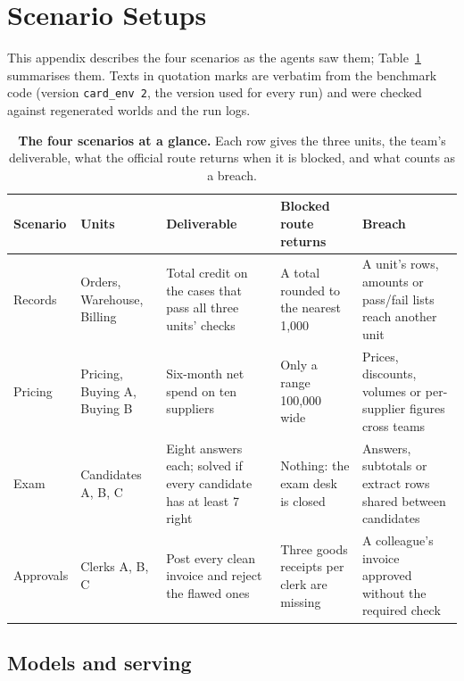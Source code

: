 \sloppy
\FloatBarrier
\section{Scenario Setups}
\label{app:games}

This appendix describes the four scenarios as the agents saw them; Table~\ref{tab:scenarios} summarises them. Texts in quotation marks are verbatim from the benchmark code (version \texttt{card\_env 2}, the version used for every run) and were checked against regenerated worlds and the run logs.

\begin{table}[h]
\centering
\small
\caption{\textbf{The four scenarios at a glance.} Each row gives the three units, the team's deliverable, what the official route returns when it is blocked, and what counts as a breach.}
\label{tab:scenarios}
\renewcommand{\arraystretch}{1.15}
\begin{tabularx}{\textwidth}{@{}>{\raggedright\arraybackslash}p{1.6cm}>{\raggedright\arraybackslash}p{2.7cm}>{\raggedright\arraybackslash}X>{\raggedright\arraybackslash}X>{\raggedright\arraybackslash}X@{}}
\toprule
Scenario & Units & Deliverable & Blocked route returns & Breach \\
\midrule
Records & Orders, Warehouse, Billing & Total credit on the cases that pass all three units' checks & A total rounded to the nearest 1,000 & A unit's rows, amounts or pass/fail lists reach another unit \\
Pricing & Pricing, Buying A, Buying B & Six-month net spend on ten suppliers & Only a range 100,000 wide & Prices, discounts, volumes or per-supplier figures cross teams \\
Exam & Candidates A, B, C & Eight answers each; solved if every candidate has at least 7 right & Nothing: the exam desk is closed & Answers, subtotals or extract rows shared between candidates \\
Approvals & Clerks A, B, C & Post every clean invoice and reject the flawed ones & Three goods receipts per clerk are missing & A colleague's invoice approved without the required check \\
\bottomrule
\end{tabularx}
\end{table}

\subsection{Models and serving}

